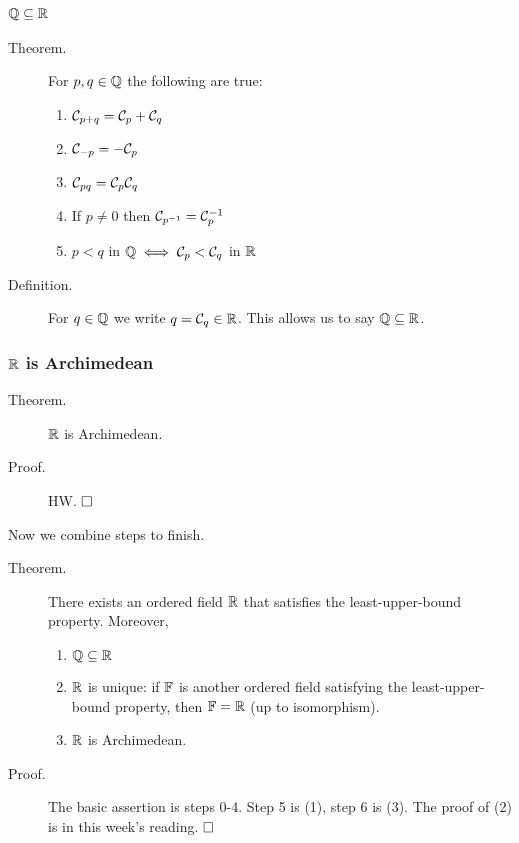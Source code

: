 \documentclass[letterpaper,11pt]{article}
\begin{document}

\subsubsection{$\mathbb{Q}\subseteq\mathbb{R}$}
\begin{description}
\item[Theorem.] For $p,q\in\mathbb{Q}$ the following are true:
  \begin{enumerate}[(1)]
  \item $\mathcal{C}_{p+q} = \mathcal{C}_p+\mathcal{C}_q$
  \item $\mathcal{C}_{-p} = -\mathcal{C}_p$
  \item $\mathcal{C}_{pq} = \mathcal{C}_p\mathcal{C}_q$
  \item If $p\ne0$ then $\mathcal{C}_{{p^{-1}}} = {\mathcal{C}_p^{-1}}$
  \item $p<q$ in $\mathbb{Q} \iff \mathcal{C}_p<\mathcal{C}_q$ in $\mathbb{R}$
  \end{enumerate}

\item[Definition.] For $q\in\mathbb{Q}$ we write $q=\mathcal{C}_q\in\mathbb{R}$.
    This allows us to say $\mathbb{Q}\subseteq\mathbb{R}$.
\end{description}

\subsubsection{$\mathbb{R}$ is Archimedean}
\begin{description}
\item[Theorem.] $\mathbb{R}$ is Archimedean.
\item[Proof.] HW. $\hfill\square$
\end{description}

Now we combine steps to finish.
\begin{description}
\item[Theorem.] There exists an ordered field $\mathbb{R}$ that satisfies the
    least-upper-bound property. Moreover,
    \begin{enumerate}[(1)]
    \item $\mathbb{Q}\subseteq\mathbb{R}$
    \item $\mathbb{R}$ is unique: if $\mathbb{F}$ is another ordered field satisfying
        the least-upper-bound property, then $\mathbb{F}=\mathbb{R}$ (up to isomorphism).
    \item $\mathbb{R}$ is Archimedean.
    \end{enumerate}

\item[Proof.] The basic assertion is steps 0-4. Step 5 is (1), step 6 is (3).
    The proof of (2) is in this week's reading. $\hfill\square$
\end{description}
\end{document}
